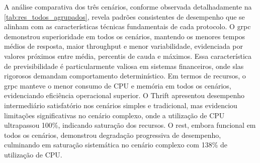 A análise comparativa dos três cenários, conforme observada detalhadamente na \autoref{tab:res_todos_agrupados}, revela padrões consistentes de desempenho que se alinham com as características técnicas fundamentais de cada protocolo. O \gls{grpc} demonstrou superioridade em todos os cenários, mantendo os menores tempos médios de resposta, maior throughput e menor variabilidade, evidenciada por valores próximos entre média, percentis de cauda e máximos. Essa característica de previsibilidade é particularmente valiosa em sistemas financeiros, onde \acrshort{sla}s rigorosos demandam comportamento determinístico. Em termos de recursos, o \gls{grpc} manteve o menor consumo de CPU e memória em todos os cenários, evidenciando eficiência operacional superior. O Thrift apresentou desempenho intermediário satisfatório nos cenários simples e tradicional, mas evidenciou limitações significativas no cenário complexo, onde a utilização de CPU ultrapassou 100\%, indicando saturação dos recursos. O \gls{rest}, embora funcional em todos os cenários, demonstrou degradação progressiva de desempenho, culminando em saturação sistemática no cenário complexo com 138\% de utilização de CPU.

